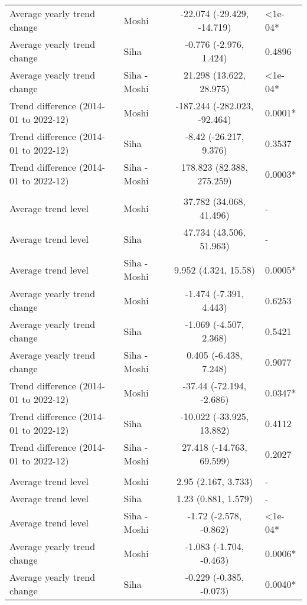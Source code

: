 \begin{longtable}{l|lcl}
Average yearly trend change & Moshi & -22.074 (-29.429, -14.719) & <1e-04* \\ 
Average yearly trend change & Siha & -0.776 (-2.976, 1.424) & 0.4896 \\ 
Average yearly trend change & Siha - Moshi & 21.298 (13.622, 28.975) & <1e-04* \\ 
Trend difference (2014-01 to 2022-12) & Moshi & -187.244 (-282.023, -92.464) & 0.0001* \\ 
Trend difference (2014-01 to 2022-12) & Siha & -8.42 (-26.217, 9.376) & 0.3537 \\ 
Trend difference (2014-01 to 2022-12) & Siha - Moshi & 178.823 (82.388, 275.259) & 0.0003* \\ 
\midrule\addlinespace[2.5pt]
\multicolumn{4}{l}{Road Traffic Accidents} \\ 
\midrule\addlinespace[2.5pt]
Average trend level & Moshi & 37.782 (34.068, 41.496) & - \\ 
Average trend level & Siha & 47.734 (43.506, 51.963) & - \\ 
Average trend level & Siha - Moshi & 9.952 (4.324, 15.58) & 0.0005* \\ 
Average yearly trend change & Moshi & -1.474 (-7.391, 4.443) & 0.6253 \\ 
Average yearly trend change & Siha & -1.069 (-4.507, 2.368) & 0.5421 \\ 
Average yearly trend change & Siha - Moshi & 0.405 (-6.438, 7.248) & 0.9077 \\ 
Trend difference (2014-01 to 2022-12) & Moshi & -37.44 (-72.194, -2.686) & 0.0347* \\ 
Trend difference (2014-01 to 2022-12) & Siha & -10.022 (-33.925, 13.882) & 0.4112 \\ 
Trend difference (2014-01 to 2022-12) & Siha - Moshi & 27.418 (-14.763, 69.599) & 0.2027 \\ 
\midrule\addlinespace[2.5pt]
\multicolumn{4}{l}{Schistosomiasis} \\ 
\midrule\addlinespace[2.5pt]
Average trend level & Moshi & 2.95 (2.167, 3.733) & - \\ 
Average trend level & Siha & 1.23 (0.881, 1.579) & - \\ 
Average trend level & Siha - Moshi & -1.72 (-2.578, -0.862) & <1e-04* \\ 
Average yearly trend change & Moshi & -1.083 (-1.704, -0.463) & 0.0006* \\ 
Average yearly trend change & Siha & -0.229 (-0.385, -0.073) & 0.0040* \\ 

\end{longtable}
